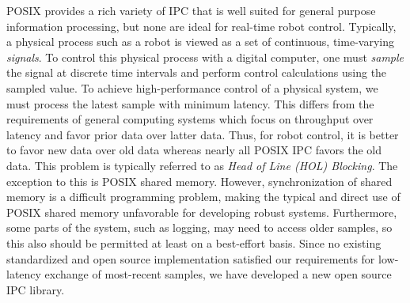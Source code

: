 \documentclass[letterpaper]{IEEEtran}
\begin{document}
POSIX provides a rich variety of IPC that is well suited for general
purpose information processing, but none are ideal for real-time robot
control.  Typically, a physical process such as a robot is viewed as a
set of continuous, time-varying \emph{signals}.  To control this
physical process with a digital computer, one must \emph{sample} the
signal at discrete time intervals and perform control calculations
using the sampled value. To achieve high-performance control of a
physical system, we must process the latest sample with minimum
latency.  This differs from the requirements of general computing
systems which focus on throughput over latency and favor prior data
over latter data.  Thus, for robot control, it is better to favor new
data over old data whereas nearly all POSIX IPC favors the old
data. This problem is typically referred to as \emph{Head of Line
  (HOL) Blocking}.  The exception to this is POSIX shared
memory. However, synchronization of shared memory is a difficult
programming problem, making the typical and direct use of POSIX shared
memory unfavorable for developing robust systems.  Furthermore, some
parts of the system, such as logging, may need to access older
samples, so this also should be permitted at least on a best-effort
basis.  Since no existing standardized and open source implementation
satisfied our requirements for low-latency exchange of most-recent
samples, we have developed a new open source IPC library.


\end{document}
